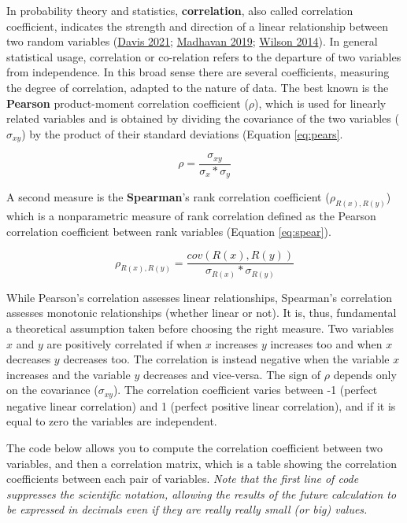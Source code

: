 \documentclass[
]{article}
\begin{document}
In probability theory and statistics, \textbf{correlation}, also called
correlation coefficient, indicates the strength and direction of a
linear relationship between two random variables (\protect\hyperlink{ref-davis2021}{Davis 2021}; \protect\hyperlink{ref-madhavan2019}{Madhavan 2019}; \protect\hyperlink{ref-wilson2014}{Wilson 2014}). In general statistical usage, correlation
or co-relation refers to the departure of two variables from
independence. In this broad sense there are several coefficients,
measuring the degree of correlation, adapted to the nature of data. The
best known is the \textbf{Pearson} product-moment correlation coefficient
(\(\rho\)), which is used for linearly related variables and is obtained
by dividing the covariance of the two variables (\(\sigma_{xy}\)) by the
product of their standard deviations (Equation \eqref{eq:pears}.

\begin{equation}
\rho=\frac{\sigma_{xy}}{\sigma_x*\sigma_y}
\label{eq:pears}
\end{equation}

A second measure is the \textbf{Spearman}'s rank correlation coefficient
(\(\rho_{R(x),R(y)}\)) which is a nonparametric measure of rank
correlation defined as the Pearson correlation coefficient between rank
variables (Equation \eqref{eq:spear}).

\begin{equation}
\rho_{R(x),R(y)}=\frac{cov{(R(x),R(y))}}{\sigma_{R(x)}*\sigma_{R(y)}}
\label{eq:spear}
\end{equation}

While Pearson's correlation assesses linear relationships, Spearman's
correlation assesses monotonic relationships (whether linear or not). It
is, thus, fundamental a theoretical assumption taken before choosing the
right measure. Two variables \(x\) and \(y\) are positively correlated if
when \(x\) increases \(y\) increases too and when \(x\) decreases \(y\)
decreases too. The correlation is instead negative when the variable \(x\)
increases and the variable \(y\) decreases and vice-versa. The sign of
\(\rho\) depends only on the covariance (\(\sigma_{xy}\)). The correlation
coefficient varies between -1 (perfect negative linear correlation) and
1 (perfect positive linear correlation), and if it is equal to zero the
variables are independent.

The code below allows you to compute the correlation coefficient between
two variables, and then a correlation matrix, which is a table showing
the correlation coefficients between each pair of variables. \emph{Note that
the first line of code suppresses the scientific notation, allowing the
results of the future calculation to be expressed in decimals even if
they are really really small (or big) values.}
\end{document}
